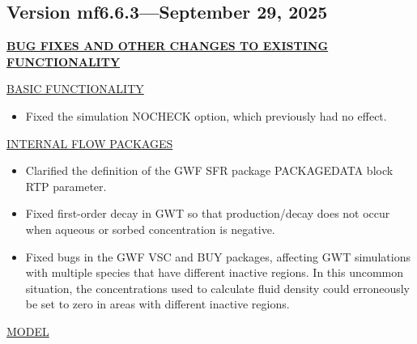 \subsection{Version mf6.6.3---September 29, 2025}

\textbf{\underline{BUG FIXES AND OTHER CHANGES TO EXISTING FUNCTIONALITY}}

\underline{BASIC FUNCTIONALITY}
\begin{itemize}
\item Fixed the simulation NOCHECK option, which previously had no effect.
\end{itemize}
\underline{INTERNAL FLOW PACKAGES}
\begin{itemize}
\item Clarified the definition of the GWF SFR package PACKAGEDATA block RTP parameter.
\item Fixed first-order decay in GWT so that production/decay does not occur when aqueous or sorbed concentration is negative.
\item Fixed bugs in the GWF VSC and BUY packages, affecting GWT simulations with multiple species that have different inactive regions.  In this uncommon situation, the concentrations used to calculate fluid density could erroneously be set to zero in areas with different inactive regions.
\end{itemize}
\underline{MODEL}

